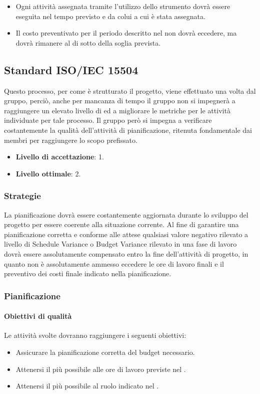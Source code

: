 \begin{itemize}
\item Ogni attività assegnata tramite l'utilizzo dello strumento  dovrà essere eseguita nel tempo previsto e da colui a cui è stata assegnata.
\item Il costo preventivato per il periodo descritto nel \PdP{} non dovrà eccedere, ma dovrà rimanere al di sotto della soglia prevista.
\end{itemize}

\subsection{Standard ISO/IEC 15504}
Questo processo, per come è strutturato il progetto, viene effettuato una volta dal gruppo, perciò, anche per mancanza di tempo il gruppo non si impegnerà a raggiungere un elevato livello di  ed a migliorare le metriche per le attività individuate per tale processo. Il gruppo però si impegna a verificare costantemente la qualità dell'attività di pianificazione, ritenuta fondamentale dai membri per raggiungere lo scopo prefissato.
\begin{itemize}
\item \textbf{Livello di accettazione}: 1.
\item \textbf{Livello ottimale}: 2.
\end{itemize}

\subsubsection{Strategie}
La pianificazione dovrà essere costantemente aggiornata durante lo sviluppo del progetto per essere coerente alla situazione corrente. Al fine di garantire una pianificazione corretta e conforme alle attese qualsiasi valore negativo rilevato a livello di Schedule Variance o Budget Variance rilevato in una fase di lavoro dovrà essere
assolutamente compensato entro la fine dell’attività di progetto, in quanto non è assolutamente
ammesso eccedere le ore di lavoro finali e il preventivo dei costi finale indicato nella pianificazione.

\subsubsection{Pianificazione}

\paragraph{Obiettivi di qualità}
Le attività svolte dovranno raggiungere i seguenti obiettivi:
\begin{itemize}
\item Assicurare la pianificazione corretta del budget necessario.
\item Attenersi il più possibile alle ore di lavoro previste nel \PdQ.
\item Attenersi il più possibile al ruolo indicato nel \PdP.
\end{itemize}

